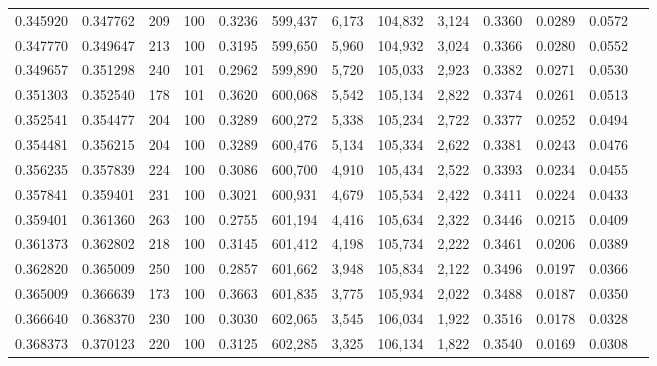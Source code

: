 \begin{tabular}{rrrrrrrrrrrrr}
0.345920 & 0.347762 &   209 & 100 &                                     0.3236 & 599,437 &   6,173 & 104,832 &   3,124 & 0.3360 & 0.0289 & 0.0572 \\
0.347770 & 0.349647 &   213 & 100 &                                     0.3195 & 599,650 &   5,960 & 104,932 &   3,024 & 0.3366 & 0.0280 & 0.0552 \\
0.349657 & 0.351298 &   240 & 101 &                                     0.2962 & 599,890 &   5,720 & 105,033 &   2,923 & 0.3382 & 0.0271 & 0.0530 \\
0.351303 & 0.352540 &   178 & 101 &                                     0.3620 & 600,068 &   5,542 & 105,134 &   2,822 & 0.3374 & 0.0261 & 0.0513 \\
0.352541 & 0.354477 &   204 & 100 &                                     0.3289 & 600,272 &   5,338 & 105,234 &   2,722 & 0.3377 & 0.0252 & 0.0494 \\
0.354481 & 0.356215 &   204 & 100 &                                     0.3289 & 600,476 &   5,134 & 105,334 &   2,622 & 0.3381 & 0.0243 & 0.0476 \\
0.356235 & 0.357839 &   224 & 100 &                                     0.3086 & 600,700 &   4,910 & 105,434 &   2,522 & 0.3393 & 0.0234 & 0.0455 \\
0.357841 & 0.359401 &   231 & 100 &                                     0.3021 & 600,931 &   4,679 & 105,534 &   2,422 & 0.3411 & 0.0224 & 0.0433 \\
0.359401 & 0.361360 &   263 & 100 &                                     0.2755 & 601,194 &   4,416 & 105,634 &   2,322 & 0.3446 & 0.0215 & 0.0409 \\
0.361373 & 0.362802 &   218 & 100 &                                     0.3145 & 601,412 &   4,198 & 105,734 &   2,222 & 0.3461 & 0.0206 & 0.0389 \\
0.362820 & 0.365009 &   250 & 100 &                                     0.2857 & 601,662 &   3,948 & 105,834 &   2,122 & 0.3496 & 0.0197 & 0.0366 \\
0.365009 & 0.366639 &   173 & 100 &                                     0.3663 & 601,835 &   3,775 & 105,934 &   2,022 & 0.3488 & 0.0187 & 0.0350 \\
0.366640 & 0.368370 &   230 & 100 &                                     0.3030 & 602,065 &   3,545 & 106,034 &   1,922 & 0.3516 & 0.0178 & 0.0328 \\
0.368373 & 0.370123 &   220 & 100 &                                     0.3125 & 602,285 &   3,325 & 106,134 &   1,822 & 0.3540 & 0.0169 & 0.0308 \\

\end{tabular}
